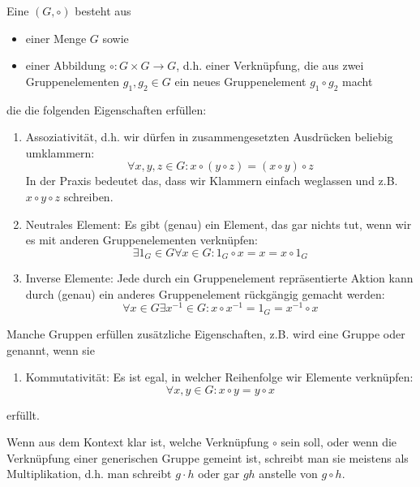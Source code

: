 \begin{definition}
Eine  $(G,\circ)$ besteht aus
\begin{itemize}
\item einer Menge $G$ sowie
\item einer Abbildung $\circ: G\times G\to G$, d.h. einer Verknüpfung, die aus zwei Gruppenelementen $g_1,g_2\in G$ ein neues Gruppenelement $g_1\circ g_2$ macht
\end{itemize}
die die folgenden Eigenschaften erfüllen:
\begin{enumerate}[label=(G\arabic*)]
\item Assoziativität, d.h. wir dürfen in zusammengesetzten Ausdrücken beliebig umklammern:
\[\forall x,y,z\in G: x\circ(y\circ z) = (x\circ y)\circ z\]
In der Praxis bedeutet das, dass wir Klammern einfach weglassen und z.B. $x\circ y\circ z$ schreiben.
\item Neutrales Element: Es gibt (genau) ein Element, das gar nichts tut, wenn wir es mit anderen Gruppenelementen verknüpfen:
\[\exists 1_G\in G \forall x\in G: 1_G\circ x = x = x\circ 1_G\]
\item Inverse Elemente: Jede durch ein Gruppenelement repräsentierte Aktion kann durch (genau) ein anderes Gruppenelement rückgängig gemacht werden:
\[\forall x\in G\exists x^{-1}\in G: x\circ x^{-1}=1_G=x^{-1}\circ x\]
\end{enumerate}
Manche Gruppen erfüllen zusätzliche Eigenschaften, z.B. wird eine Gruppe  oder  genannt, wenn sie
\begin{enumerate}[label=(G\arabic*),resume]
\item Kommutativität: Es ist egal, in welcher Reihenfolge wir Elemente verknüpfen:
\[\forall x,y\in G: x\circ y = y\circ x\]
\end{enumerate}
erfüllt.

Wenn aus dem Kontext klar ist, welche Verknüpfung $\circ$ sein soll, oder wenn die Verknüpfung einer generischen Gruppe gemeint ist, schreibt man sie meistens als Multiplikation, d.h. man schreibt $g\cdot h$ oder gar $gh$ anstelle von $g\circ h$.
\end{definition}

